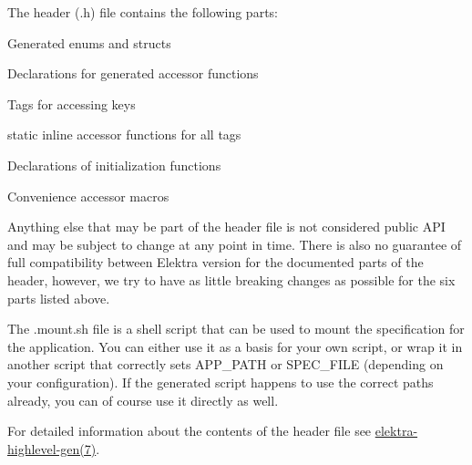 The header ({\ttfamily .h}) file contains the following parts\+:


\begin{DoxyEnumerate}
\item Generated {\ttfamily enum}s and {\ttfamily struct}s
\item Declarations for generated accessor functions
\item Tags for accessing keys
\item {\ttfamily static inline} accessor functions for all tags
\item Declarations of initialization functions
\item Convenience accessor macros
\end{DoxyEnumerate}

Anything else that may be part of the header file is not considered public A\+PI and may be subject to change at any point in time. There is also no guarantee of full compatibility between Elektra version for the documented parts of the header, however, we try to have as little breaking changes as possible for the six parts listed above.

The {\ttfamily .mount.\+sh} file is a shell script that can be used to mount the specification for the application. You can either use it as a basis for your own script, or wrap it in another script that correctly sets {\ttfamily A\+P\+P\+\_\+\+P\+A\+TH} or {\ttfamily S\+P\+E\+C\+\_\+\+F\+I\+LE} (depending on your configuration). If the generated script happens to use the correct paths already, you can of course use it directly as well.

For detailed information about the contents of the header file see \mbox{\hyperlink{doc_help_elektra-highlevel-gen_md}{elektra-\/highlevel-\/gen(7)}}.


